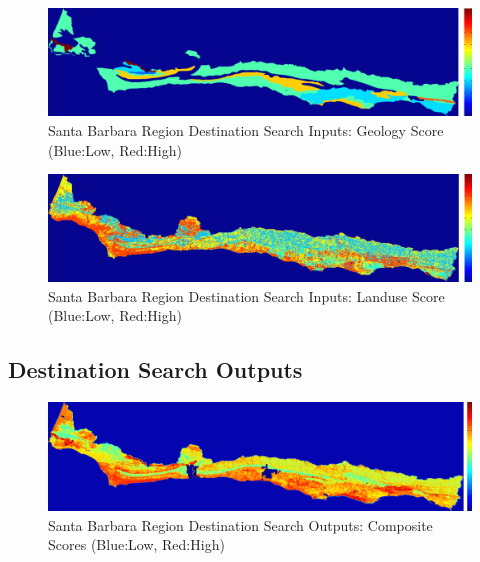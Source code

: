         \begin{figure}[!h]
            \begin{center}
            \includegraphics[width=5.5in]{figures/SantaBarbara_Search_Geology.png}   
            \caption{Santa Barbara Region Destination Search Inputs: Geology Score (Blue:Low, Red:High)}
            \label{fig:SBdsinputs_geology}
            \end{center}
        \end{figure}
    
        \begin{figure}[!h]
            \begin{center}
            \includegraphics[width=5.5in]{figures/SantaBarbara_Search_Landuse.png}   
            \caption{Santa Barbara Region Destination Search Inputs: Landuse Score (Blue:Low, Red:High)}
            \label{fig:SBdsinputs_landuse}
            \end{center}
        \end{figure}
    
    \subsection{Destination Search Outputs}
    
        \begin{figure}[!h]
            \begin{center}
            \includegraphics[width=5.5in]{figures/SantaBarbara_Search_Composite.png}   
            \caption{Santa Barbara Region Destination Search Outputs: Composite Scores (Blue:Low, Red:High)}
            \label{fig:SBdsoutputs_comp}
            \end{center}
        \end{figure}
        
